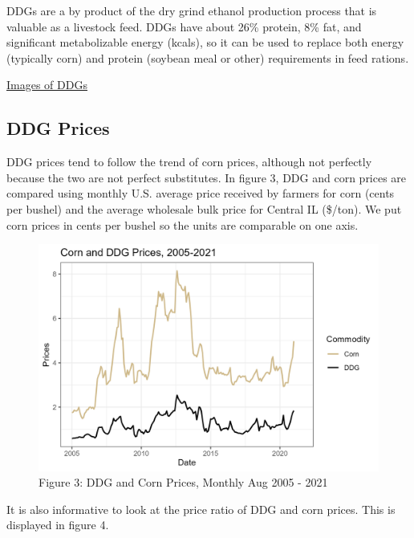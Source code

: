 \documentclass[
  letterpaper,
  DIV=11,
  numbers=noendperiod]{scrreprt}
\begin{document}
DDGs are a by product of the dry grind ethanol production process that
is valuable as a livestock feed. DDGs have about 26\% protein, 8\% fat,
and significant metabolizable energy (kcals), so it can be used to
replace both energy (typically corn) and protein (soybean meal or other)
requirements in feed rations.

\href{https://www.google.com/search?q=ddgs\&source=lnms\&tbm=isch\&sa=X\&ved=0ahUKEwj4udmomr7JAhWF2B4KHailApcQ_AUICCgC\&biw=1920\&bih=1031\#}{Images
of DDGs}

\hypertarget{ddg-prices}{%
\subsection{DDG Prices}\label{ddg-prices}}

DDG prices tend to follow the trend of corn prices, although not
perfectly because the two are not perfect substitutes. In figure 3, DDG
and corn prices are compared using monthly U.S. average price received
by farmers for corn (cents per bushel) and the average wholesale bulk
price for Central IL (\$/ton). We put corn prices in cents per bushel so
the units are comparable on one axis.

\begin{figure}

{\centering \includegraphics{assets/CornDDGPrices.png}

}

\caption{Figure 3: DDG and Corn Prices, Monthly Aug 2005 - 2021}

\end{figure}

It is also informative to look at the price ratio of DDG and corn
prices. This is displayed in figure 4.
\end{document}
